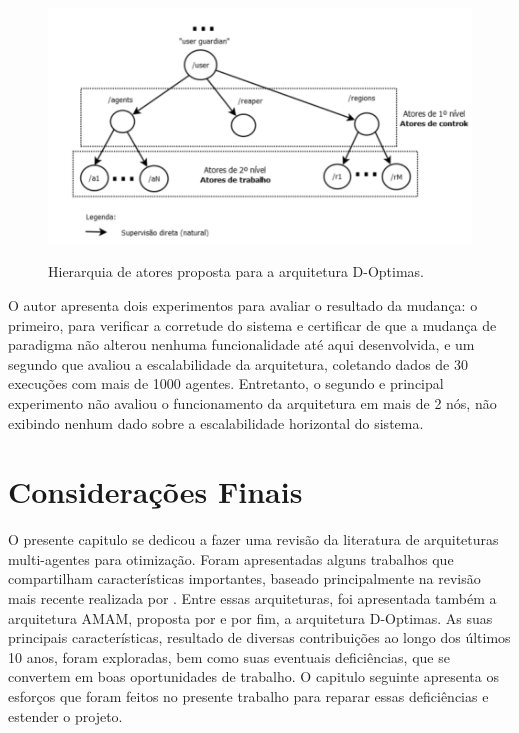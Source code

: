 \begin{figure}
    \centering
    \caption{Hierarquia de atores proposta para a arquitetura D-Optimas.}
    \includegraphics[scale=0.4]{imagens/d-optimas-pacheco.png}
    \label{fig:d_optimas_pacheco}
\end{figure}

O autor apresenta dois experimentos para avaliar o resultado da mudança: o primeiro, para verificar a corretude do sistema e certificar de que a mudança de paradigma não alterou nenhuma funcionalidade até aqui desenvolvida, e um segundo que avaliou a escalabilidade da arquitetura, coletando dados de 30 execuções com mais de 1000 agentes. Entretanto, o segundo e principal experimento não avaliou o funcionamento da arquitetura em mais de 2 nós, não exibindo nenhum dado sobre a escalabilidade horizontal do sistema.

\section{Considerações Finais}
O presente capitulo se dedicou a fazer uma revisão da literatura de arquiteturas multi-agentes para otimização. Foram apresentadas alguns trabalhos que compartilham características importantes, baseado principalmente na revisão mais recente realizada por . Entre essas arquiteturas, foi apresentada também a arquitetura AMAM, proposta por  e por fim, a arquitetura D-Optimas. As suas principais características, resultado de diversas contribuições ao longo dos últimos 10 anos, foram exploradas, bem como suas eventuais deficiências, que se convertem em boas oportunidades de trabalho. O capitulo seguinte apresenta os esforços que foram feitos no presente trabalho para reparar essas deficiências e estender o projeto. 